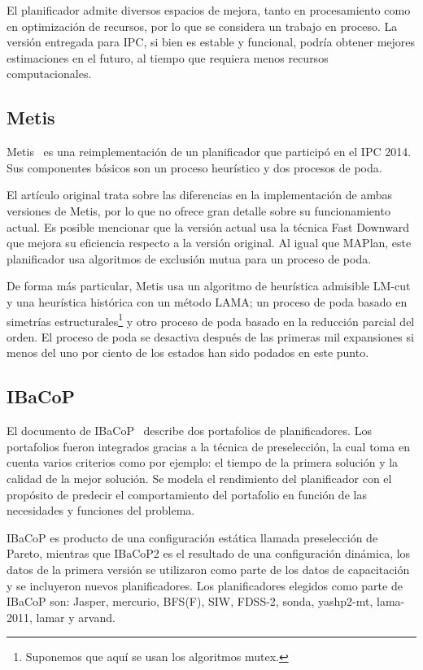 \documentclass[a4paper,12pt,twocolumn]{article}
\begin{document}
El planificador admite diversos espacios de mejora, tanto en procesamiento como en optimización de recursos, por lo que se considera un trabajo en proceso. La versión entregada para IPC, si bien es estable y funcional, podría obtener mejores estimaciones en el futuro, al tiempo que requiera menos recursos computacionales.

\subsection{Metis}

Metis~\citep{sievers2018metis} es una reimplementación de un planificador que participó en el IPC 2014. Sus componentes básicos son un proceso heurístico y dos procesos de poda.

El artículo original trata sobre las diferencias en la implementación de ambas versiones de Metis, por lo que no ofrece gran detalle sobre su funcionamiento actual. Es posible mencionar que la versión actual usa la técnica Fast Downward que mejora su eficiencia respecto a la versión original. Al igual que MAPlan, este planificador usa algoritmos de exclusión mutua para un proceso de poda.

De forma más particular, Metis  usa un algoritmo de heurística admisible LM-cut y una heurística histórica con un método LAMA; un proceso de poda basado en simetrías estructurales\footnote{Suponemos que aquí se usan los algoritmos mutex.} y otro proceso de poda basado en la reducción parcial del orden. El proceso de poda se desactiva después de las primeras mil expansiones si menos del uno por ciento de los estados han sido podados en este punto.

\subsection{IBaCoP}

El documento de IBaCoP~\citep{cenamor2018ibacop} describe dos portafolios de planificadores. Los portafolios fueron integrados gracias a la técnica de preselección, la cual toma en cuenta varios criterios como por ejemplo: el tiempo de la primera solución y la calidad de la mejor solución. Se modela el rendimiento del planificador con el propósito de predecir el comportamiento del portafolio en función de las necesidades y funciones del problema.

IBaCoP es producto de una configuración estática llamada preselección de Pareto, mientras que IBaCoP2 es el resultado de una configuración dinámica, los datos de la primera versión se utilizaron como parte de los datos de capacitación y se incluyeron nuevos planificadores. Los planificadores elegidos como parte de IBaCoP son: Jasper, mercurio, BFS(F), SIW, FDSS-2, sonda, yashp2-mt, lama-2011, lamar y arvand.
\end{document}

